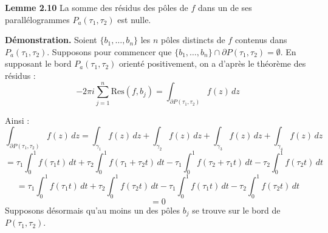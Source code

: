 \documentclass{article}
\begin{document}
\textbf{Lemme 2.10} La somme des résidus des pôles de \( f \) dans un de ses parallélogrammes \( P_a(\tau_1,\tau_2) \) est nulle.

\textbf{Démonstration.}
Soient \( \{b_1, \ldots, b_n \}\) les $n$ pôles distincts de \( f \) contenus dans \( P_a(\tau_1, \tau_2) \).
Supposons pour commencer que \( \{b_1, \ldots, b_n\} \cap \partial P(\tau_1, \tau_2) = \emptyset \).
En supposant le bord \( P_a(\tau_1, \tau_2) \) orienté positivement, on a d'après le théorème des résidus :
\[
-2\pi i \sum_{j=1}^n \text{Res}(f, b_j) = \int_{\partial P(\tau_1,\tau_2)} f(z) \, dz
\]

Ainsi :
\[
\int_{\partial P(\tau_1,\tau_2)} f(z) \, dz = \int_{\gamma_1} f(z) \, dz + \int_{\gamma_2} f(z) \, dz + \int_{\gamma_3} f(z) \, dz + \int_{\gamma_4} f(z) \, dz 
\]
\[
= \tau_1 \int_0^1 f(\tau_1 t) \, dt + \tau_2 \int_0^1 f(\tau_1 + \tau_2 t) \, dt - \tau_1 \int_0^1 f(\tau_2 + \tau_1 t) \, dt - \tau_2 \int_0^1 f(\tau_2 t) \, dt
\]
\[
= \tau_1 \int_0^1 f(\tau_1 t) \, dt + \tau_2 \int_0^1 f(\tau_2 t) \, dt - \tau_1 \int_0^1 f(\tau_1 t) \, dt - \tau_2 \int_0^1 f(\tau_2 t) \, dt
\]
\[
= 0
\]
Supposons désormais qu'au moins un des pôles \( b_j \) se trouve sur le bord de \( P(\tau_1, \tau_2) \).
\end{document}
